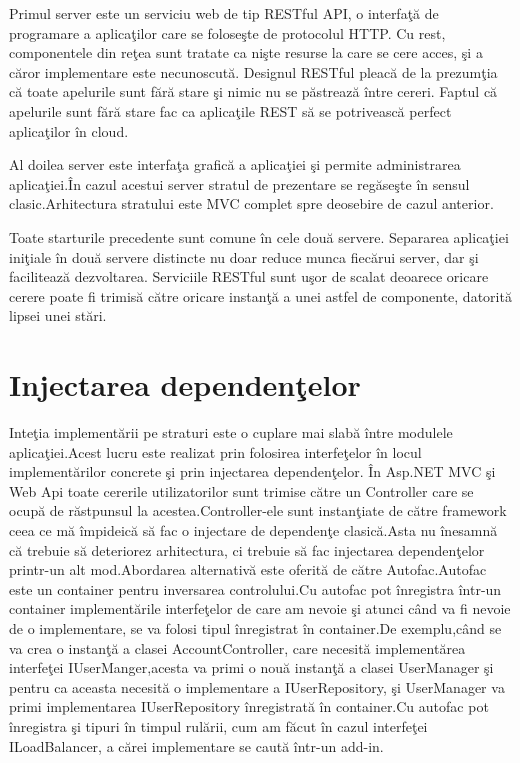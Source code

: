 \documentclass[a4paper,12pt]{report}
\begin{document}
Primul server este un serviciu web de tip RESTful API, o interfa\c t\u a de programare a aplica\c tilor care 
se folose\c ste de protocolul HTTP. Cu rest, componentele din re\c tea sunt tratate ca ni\c ste resurse
la care se cere acces, \c si a c\u aror implementare este necunoscut\u a. Designul RESTful pleac\u a 
de la prezum\c tia c\u a toate apelurile sunt f\u ar\u a stare \c si nimic nu se p\u astreaz\u a \^intre 
cereri. Faptul c\u a apelurile sunt f\u ar\u a stare fac ca aplica\c tile REST s\u a se potriveasc\u a
perfect aplica\c tilor \^in cloud.  

Al doilea server este interfa\c ta grafic\u a a aplica\c tiei \c si permite administrarea aplica\c tiei.\^In cazul 
acestui server stratul de prezentare se reg\u ase\c ste \^in sensul clasic.Arhitectura stratului este MVC complet spre
deosebire de cazul anterior.

Toate starturile precedente sunt comune \^in cele dou\u a servere.
Separarea aplica\c tiei ini\c tiale \^in dou\u a servere distincte nu doar reduce munca fiec\u arui server,
dar \c si faciliteaz\u a dezvoltarea. Serviciile RESTful sunt u\c sor de scalat deoarece oricare cerere poate fi 
trimis\u a c\u atre oricare instan\c t\u a a unei astfel de componente, datorit\u a lipsei unei st\u ari.

\section{Injectarea dependen\c telor}

Inte\c tia implement\u arii pe straturi este o cuplare mai slab\u a \^intre modulele aplica\c tiei.Acest lucru este 
realizat prin folosirea interfe\c telor \^in locul implement\u arilor concrete \c si prin injectarea dependen\c telor.
\^In Asp.NET MVC \c si Web Api toate cererile utilizatorilor sunt trimise c\u atre un Controller care se ocup\u a de
r\u astpunsul la acestea.Controller-ele sunt instan\c tiate de c\u atre framework ceea ce m\u a \^impideic\u a s\u a 
fac o injectare de dependen\c te clasic\u a.Asta nu \^inesamn\u a c\u a trebuie s\u a deteriorez  arhitectura, ci 
trebuie s\u a fac injectarea dependen\c telor printr-un alt mod.Abordarea alternativ\u a este oferit\u a de c\u atre 
Autofac.Autofac este un container pentru inversarea controlului.Cu autofac pot \^inregistra \^intr-un container 
implement\u arile interfe\c telor de care am nevoie \c si atunci c\^and va fi nevoie de o implementare, se va folosi tipul
\^inregistrat \^in container.De exemplu,c\^and se va crea o instan\c t\u a a clasei AccountController, care necesit\u a 
implement\u area interfe\c tei IUserManger,acesta va primi o nou\u a instan\c t\u a a clasei UserManager \c si pentru ca 
aceasta necesit\u a o implementare a IUserRepository, \c si UserManager va primi implementarea IUserRepository \^inregistrat\u a
\^in container.Cu autofac pot \^inregistra \c si tipuri \^in timpul rul\u arii, cum am f\u acut \^in cazul interfe\c tei 
ILoadBalancer, a c\u arei implementare se caut\u a \^intr-un add-in.
\end{document}

